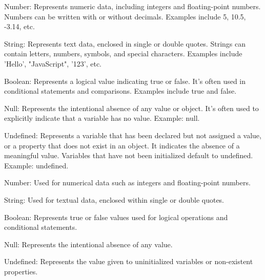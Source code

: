 
Number: 
Represents numeric data, including integers and floating-point numbers. Numbers can be written with or without decimals. 
Examples include 5, 10.5, -3.14, etc.

String:
 Represents text data, enclosed in single or double quotes. Strings can contain letters, numbers, symbols, and special 
characters. Examples include 'Hello', "JavaScript", '123', etc.

Boolean: 
Represents a logical value indicating true or false. It's often used in conditional statements and comparisons. Examples 
include true and false.

Null:
 Represents the intentional absence of any value or object. It's often used to explicitly indicate that a variable has no value. 
Example: null.

Undefined: 
Represents a variable that has been declared but not assigned a value, or a property that does not exist in an object. It 
indicates the absence of a meaningful value. Variables that have not been initialized default to undefined. Example: undefined.


Number: Used for numerical data such as integers and floating-point numbers.

String: Used for textual data, enclosed within single or double quotes.

Boolean: Represents true or false values used for logical operations and conditional statements.

Null: Represents the intentional absence of any value.

Undefined: Represents the value given to uninitialized variables or non-existent properties.